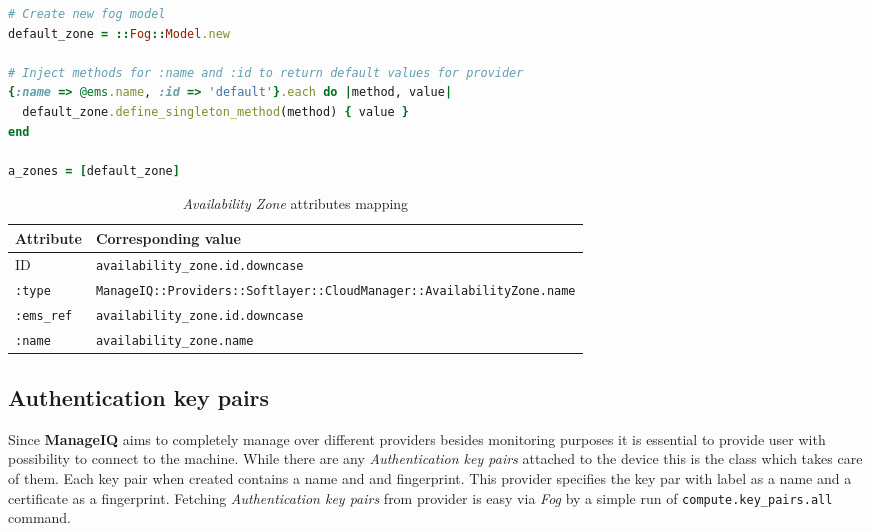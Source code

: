 \begin{lstlisting}[language=Ruby,caption={Declaration of the default \emph{Availability Zone}},label=code:fog_model_zone,float=htpb]
# Create new fog model
default_zone = ::Fog::Model.new

# Inject methods for :name and :id to return default values for provider
{:name => @ems.name, :id => 'default'}.each do |method, value|
  default_zone.define_singleton_method(method) { value }
end

a_zones = [default_zone]
\end{lstlisting}

\begin{table}[ht]
	\centering
	\caption{\emph{Availability Zone} attributes mapping}\label{tab:Availability Zone attributes mapping}
	\begin{tabular}{ll}
		\toprule
		Attribute          & Corresponding value                                                                \\
		\midrule
		ID                 & \texttt{availability\_zone.id.downcase}                                            \\
		\texttt{:type}     & \small\texttt{ManageIQ::Providers::Softlayer::CloudManager::AvailabilityZone.name} \\
		\texttt{:ems\_ref} & \texttt{availability\_zone.id.downcase}                                            \\
		\texttt{:name}     & \texttt{availability\_zone.name}                                                   \\
		\bottomrule
	\end{tabular}
\end{table}

\subsection{Authentication key pairs}
\label{sub:Authentication key pairs}

Since \textbf{ManageIQ} aims to completely manage over different providers besides monitoring purposes it is essential to provide user with possibility to connect to the machine. While there are any \emph{Authentication key pairs} attached to the device this is the class which takes care of them. Each key pair when created contains a name and and fingerprint. This provider specifies the key par with label as a name and a certificate as a fingerprint. Fetching \emph{Authentication key pairs} from provider is easy via \emph{Fog} by a simple run of \texttt{compute.key\_pairs.all} command.

